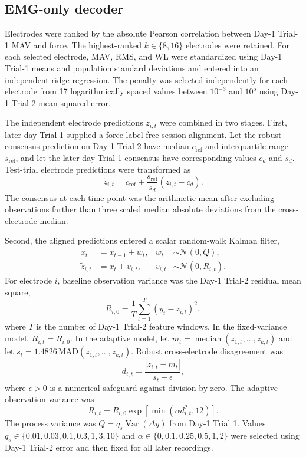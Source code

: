\documentclass[preprint,12pt]{elsarticle}
\begin{document}
\subsection{EMG-only decoder}

Electrodes were ranked by the absolute Pearson correlation between Day-1 Trial-1 MAV and force. The highest-ranked $k\in\{8,16\}$ electrodes were retained. For each selected electrode, MAV, RMS, and WL were standardized using Day-1 Trial-1 means and population standard deviations and entered into an independent ridge regression. The penalty was selected independently for each electrode from 17 logarithmically spaced values between $10^{-3}$ and $10^5$ using Day-1 Trial-2 mean-squared error.

The independent electrode predictions $z_{i,t}$ were combined in two stages. First, later-day Trial 1 supplied a force-label-free session alignment. Let the robust consensus prediction on Day-1 Trial 2 have median $c_{\mathrm{ref}}$ and interquartile range $s_{\mathrm{ref}}$, and let the later-day Trial-1 consensus have corresponding values $c_d$ and $s_d$. Test-trial electrode predictions were transformed as
\begin{equation}
\tilde z_{i,t}=c_{\mathrm{ref}}+\frac{s_{\mathrm{ref}}}{s_d}\left(z_{i,t}-c_d\right).
\end{equation}
The consensus at each time point was the arithmetic mean after excluding observations farther than three scaled median absolute deviations from the cross-electrode median.

Second, the aligned predictions entered a scalar random-walk Kalman filter,
\begin{align}
x_t &= x_{t-1}+w_t, & w_t&\sim\mathcal N(0,Q),\\
\tilde z_{i,t} &= x_t+v_{i,t}, & v_{i,t}&\sim\mathcal N(0,R_{i,t}).
\end{align}
For electrode $i$, baseline observation variance was the Day-1 Trial-2 residual mean square,
\begin{equation}
R_{i,0}=\frac{1}{T}\sum_{t=1}^{T}\left(y_t-z_{i,t}\right)^2,
\end{equation}
where $T$ is the number of Day-1 Trial-2 feature windows. In the fixed-variance model, $R_{i,t}=R_{i,0}$. In the adaptive model, let $m_t=\operatorname{median}(z_{1,t},\ldots,z_{k,t})$ and let $s_t=1.4826\,\mathrm{MAD}(z_{1,t},\ldots,z_{k,t})$. Robust cross-electrode disagreement was
\begin{equation}
d_{i,t}=\frac{|z_{i,t}-m_t|}{s_t+\epsilon},
\end{equation}
where $\epsilon>0$ is a numerical safeguard against division by zero. The adaptive observation variance was
\begin{equation}
R_{i,t}=R_{i,0}\exp\!\left[\min(\alpha d_{i,t}^2,12)\right].
\end{equation}
The process variance was $Q=q_s\operatorname{Var}(\Delta y)$ from Day-1 Trial 1. Values $q_s\in\{0.01,0.03,0.1,0.3,1,3,10\}$ and $\alpha\in\{0,0.1,0.25,0.5,1,2\}$ were selected using Day-1 Trial-2 error and then fixed for all later recordings.
\end{document}
